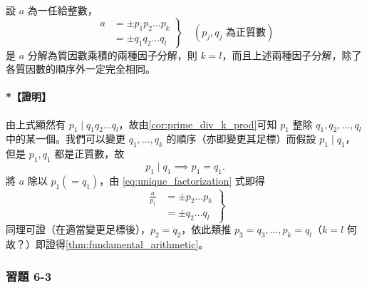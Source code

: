 \begin{theorem}[因子分解的唯一性]\label{thm:fundamental_arithmetic}
設 $a$ 為一任給整數，
\begin{equation}
  \left. \begin{aligned}
    a &= \pm p_1 p_2 \dots p_k \\
      &= \pm q_1 q_2 \dots q_l
  \end{aligned} \right\} \quad (p_j, q_j \text{ 為正質數}) \label{eq:unique_factorization}
\end{equation}
是 $a$ 分解為質因數乘積的兩種因子分解，則 $k=l$，而且上述兩種因子分解，除了各質因數的順序外一定完全相同。
\end{theorem}

\paragraph{*【證明】}
由上式顯然有 $p_1 \mid q_1 q_2 \dots q_l$，故由\cref{cor:prime_div_k_prod}可知 $p_1$ 整除 $q_1, q_2, \dots, q_l$ 中的某一個。我們可以變更 $q_1, \dots, q_k$ 的順序（亦即變更其足標）而假設 $p_1 \mid q_1$，但是 $p_1, q_1$ 都是正質數，故
\begin{equation*}
  p_1 \mid q_1 \implies p_1 = q_1.
\end{equation*}
將 $a$ 除以 $p_1 (=q_1)$，由 \eqref{eq:unique_factorization} 式即得
\begin{equation}
  \left. \begin{aligned}
    \frac{a}{p_1} &= \pm p_2 \dots p_k \\
    &= \pm q_2 \dots q_l
  \end{aligned} \right\} \label{eq:unique_factorization_quot}
\end{equation}
同理可證（在適當變更足標後），$p_2 = q_2$，依此類推 $p_3 = q_3, \dots, p_k = q_l$（$k=l$ 何故？）即證得\cref{thm:fundamental_arithmetic}。

\subsubsection*{習題 6-3}\label{sec:ex6-3}

